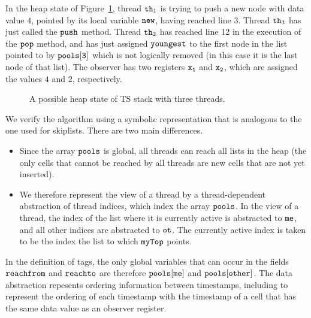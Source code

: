 In the heap state of Figure~\ref{fig:tsshape},
thread ${\tt th}_1$ is trying to push a new node with data value $4$, pointed by its local variable $\tt new$, having reached line 3.
Thread ${\tt th}_3$ has just called the ${\tt push}$ method.
Thread ${\tt th}_2$ has reached line 12 in the execution of the ${\tt pop}$ method,  and has just assigned ${\tt youngest}$ to the first node in the list
pointed to by $\tt pools[3]$ which is not logically removed (in this case it is the last node of that list).
The observer has two registers
$\tt x_1$ and $\tt x_2$, which are assigned the values $4$ and $2$,
respectively.

\begin{figure}
\center
	
\caption{A possible heap state of TS stack with three threads.}
\label{fig:tsshape}
\end{figure} 

We verify the algorithm using a symbolic representation that is analogous
to the one used for skiplists. There are two main differences.
\begin{itemize}
\item
  Since the array $\tt pools$ is global, all threads can reach all lists in
  the heap (the only cells that cannot be reached by all threads are
  new cells that are not yet inserted).
\item
  We therefore represent the view of a thread by a thread-dependent abstraction
  of thread indices, which index the array $\tt pools$. In the view of
  a thread, the index of the list where it is currently active
  is abstracted to $\tt me$, and all other
  indices are abstracted to $\tt ot$. The currently active index is taken to
  be the index the list to which $\tt myTop$ points.
\end{itemize}
In the definition of tags, the only global variables that can occur in
the fields $\mathtt{reachfrom}$ and $\mathtt{reachto}$ are therefore
$\tt pools[me]$ and $\tt pools[other]$. The data abstraction repesents
ordering information between timestamps, including to represent the ordering
of each timestamp with the timestamp of a cell that has the same data value
as an observer register.

